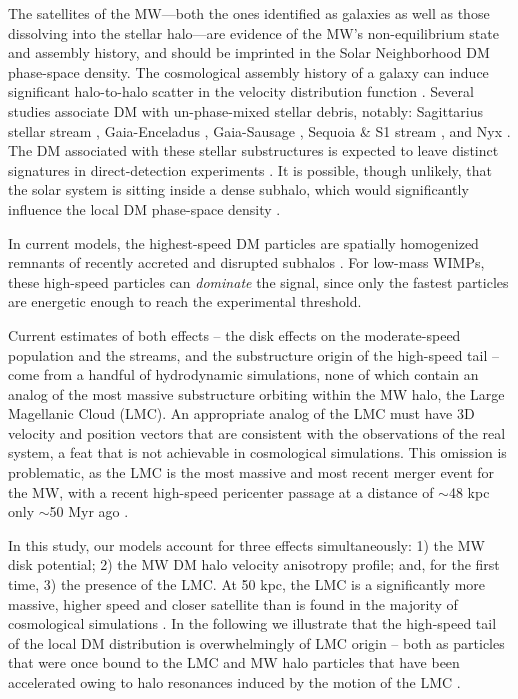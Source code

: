 \documentclass[letterpaper,11pt]{article}
\begin{document}
The satellites of the MW---both the ones identified as galaxies as well as those dissolving into the stellar halo---are evidence of the MW's non-equilibrium state and assembly history, and should be imprinted in the Solar Neighborhood DM phase-space density. The cosmological assembly history of a galaxy can induce significant halo-to-halo scatter in the velocity distribution function \citep{Mao:2013,Mao:2014}. Several studies associate DM with un-phase-mixed stellar debris, notably: Sagittarius stellar stream \citep{LyndenBell:1995zz,Newberg:2001sx}, Gaia-Enceladus \citep{Helmi2018,Kruijssen2019}, Gaia-Sausage \citep{Belokurov2018}, Sequoia \& S1 stream \citep{Myeong2019, Myeong2018}, and Nyx \cite{Necib2019}. The DM associated with these stellar substructures is expected to 
leave distinct signatures in direct-detection experiments \cite{Freese:2003na,Freese:2003tt,Purcell:2012sh,Evans:2019bqy,OHare:2017,OHare:2018trr,Necib:2019iwb,Buckley:2019}.  It is possible, though unlikely, that the solar system is sitting inside a dense subhalo, which would significantly influence the local DM phase-space density \cite{Stiff2001,Helmi2002,Kamionkowski2008}. 

In current models, the highest-speed DM particles  %
are spatially homogenized remnants of recently accreted and disrupted subhalos  \citep{Kuhlen:2010,Kuhlen:2012,Necib:2018igl}.
For low-mass WIMPs, these high-speed particles can {\it dominate} the signal, since only the fastest particles are energetic enough to reach the experimental threshold. 


Current estimates of both effects -- the disk effects on the moderate-speed population and the streams, and the substructure origin of the high-speed tail -- come from a handful of hydrodynamic simulations, none of which 
contain an analog of the most massive substructure orbiting within the MW halo, the Large Magellanic Cloud (LMC).
An appropriate analog of the LMC must have 3D velocity and position 
vectors that are consistent with the observations of the real system, a feat that is not achievable in cosmological simulations. This omission is problematic, as the LMC is the most massive and most recent merger event for the MW, with a recent high-speed pericenter passage at a distance of $\sim $48 kpc only $\sim$50 Myr ago \cite{Besla:2007}. 

In this study, our models account for three effects simultaneously: 1) the MW disk potential; 2) the MW DM halo velocity anisotropy profile; and, for the first time, 3) the presence of the LMC.  At 50 kpc, the LMC is a significantly more massive, higher speed and closer satellite than is found in the majority of cosmological simulations \citep{Boylan:2011,Patel:2017}. 
In the following we illustrate that the high-speed tail of the local DM distribution is 
overwhelmingly of LMC origin -- both as particles that were once bound to the LMC and 
MW halo particles that have been accelerated owing to halo resonances induced by 
the motion of the LMC \cite{G19}. 
\end{document}
